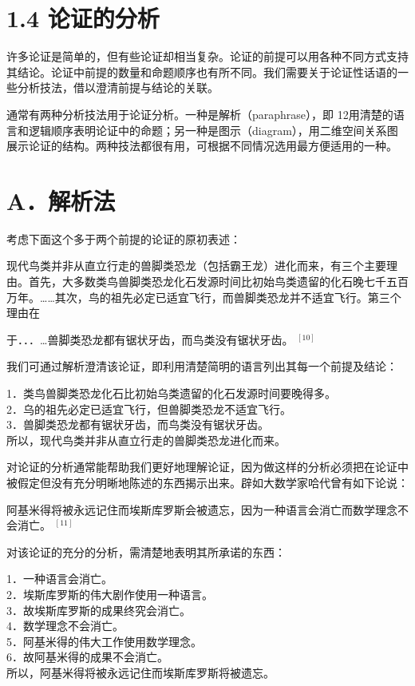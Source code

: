 \section*{1.4 论证的分析}
许多论证是简单的，但有些论证却相当复杂。论证的前提可以用各种不同方式支持其结论。论证中前提的数量和命题顺序也有所不同。我们需要关于论证性话语的一些分析技法，借以澄清前提与结论的关联。

通常有两种分析技法用于论证分析。一种是解析（paraphrase），即 12用清楚的语言和逻辑顺序表明论证中的命题；另一种是图示（diagram），用二维空间关系图展示论证的结构。两种技法都很有用，可根据不同情况选用最方便适用的一种。

\section*{A．解析法}
考虑下面这个多于两个前提的论证的原初表述：

现代鸟类并非从直立行走的兽脚类恐龙（包括霸王龙）进化而来，有三个主要理由。首先，大多数类鸟兽脚类恐龙化石发源时间比初始鸟类遗留的化石晚七千五百万年。……其次，鸟的祖先必定已适宜飞行，而兽脚类恐龙并不适宜飞行。第三个理由在

于．．．…兽脚类恐龙都有锯状牙齿，而鸟类没有锯状牙齿。 ${}^{[10]}$

我们可通过解析澄清该论证，即利用清楚简明的语言列出其每一个前提及结论：

1．类鸟兽脚类恐龙化石比初始乌类遗留的化石发源时间要晚得多。\\
2．乌的祖先必定已适宜飞行，但兽脚类恐龙不适宜飞行。\\
3．兽脚类恐龙都有锯状牙齿，而鸟类没有锯状牙齿。\\
所以，现代鸟类并非从直立行走的兽脚类恐龙进化而来。

对论证的分析通常能帮助我们更好地理解论证，因为做这样的分析必须把在论证中被假定但没有充分明晰地陈述的东西揭示出来。辟如大数学家哈代曾有如下论说：

阿基米得将被永远记住而埃斯库罗斯会被遗忘，因为一种语言会消亡而数学理念不会消亡。 ${}^{[11]}$

对该论证的充分的分析，需清楚地表明其所承诺的东西：

1．一种语言会消亡。\\
2．埃斯库罗斯的伟大剧作使用一种语言。\\
3．故埃斯库罗斯的成果终究会消亡。\\
4．数学理念不会消亡。\\
5．阿基米得的伟大工作使用数学理念。\\
6．故阿基米得的成果不会消亡。\\
所以，阿基米得将被永远记住而埃斯库罗斯将被遗忘。

